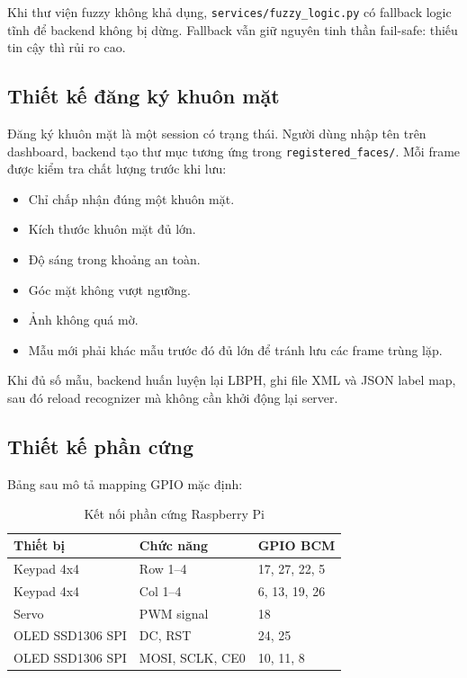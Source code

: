 Khi thư viện fuzzy không khả dụng, \texttt{services/fuzzy\_logic.py} có fallback logic tĩnh để backend không bị dừng. Fallback vẫn giữ nguyên tinh thần fail-safe: thiếu tin cậy thì rủi ro cao.

\subsection{Thiết kế đăng ký khuôn mặt}

Đăng ký khuôn mặt là một session có trạng thái. Người dùng nhập tên trên dashboard, backend tạo thư mục tương ứng trong \texttt{registered\_faces/}. Mỗi frame được kiểm tra chất lượng trước khi lưu:

\begin{itemize}
    \item Chỉ chấp nhận đúng một khuôn mặt.
    \item Kích thước khuôn mặt đủ lớn.
    \item Độ sáng trong khoảng an toàn.
    \item Góc mặt không vượt ngưỡng.
    \item Ảnh không quá mờ.
    \item Mẫu mới phải khác mẫu trước đó đủ lớn để tránh lưu các frame trùng lặp.
\end{itemize}

Khi đủ số mẫu, backend huấn luyện lại LBPH, ghi file XML và JSON label map, sau đó reload recognizer mà không cần khởi động lại server.

\subsection{Thiết kế phần cứng}

Bảng sau mô tả mapping GPIO mặc định:

\begin{table}[H]
\centering
\caption{Kết nối phần cứng Raspberry Pi}
\label{tab:hardware_pins}
\begin{tabular}{|l|l|l|}
\hline
\textbf{Thiết bị} & \textbf{Chức năng} & \textbf{GPIO BCM} \\
\hline
Keypad 4x4 & Row 1--4 & 17, 27, 22, 5 \\
\hline
Keypad 4x4 & Col 1--4 & 6, 13, 19, 26 \\
\hline
Servo & PWM signal & 18 \\
\hline
OLED SSD1306 SPI & DC, RST & 24, 25 \\
\hline
OLED SSD1306 SPI & MOSI, SCLK, CE0 & 10, 11, 8 \\
\hline
\end{tabular}
\end{table}

